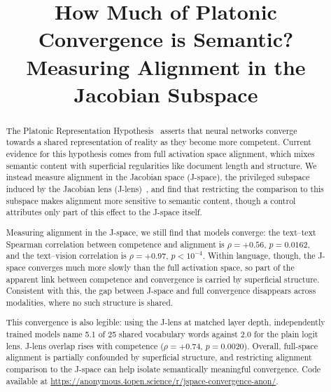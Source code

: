 \documentclass{article}
\title{How Much of Platonic Convergence is Semantic? Measuring Alignment in the Jacobian Subspace}
\author{%
}
\begin{document}
\raggedbottom

\maketitle

\begin{abstract}
  The Platonic Representation Hypothesis~\citep{huh2024platonic} asserts that neural networks converge towards a shared representation of reality as they become more competent. Current evidence for this hypothesis comes from full activation space alignment, which mixes semantic content with superficial regularities like document length and structure. We instead measure alignment in the Jacobian space (J-space), the privileged subspace induced by the Jacobian lens (J-lens)~\citep{gurnee2026verbalizable}, and find that restricting the comparison to this subspace makes alignment more sensitive to semantic content, though a control attributes only part of this effect to the J-space itself.
  
  Measuring alignment in the J-space, we still find that models converge: the text--text Spearman correlation between competence and alignment is $\rho = +0.56$, $p = 0.0162$, and the text--vision correlation is $\rho = +0.97$, $p < 10^{-4}$. Within language, though, the J-space converges much more slowly than the full activation space, so part of the apparent link between competence and convergence is carried by superficial structure. Consistent with this, the gap between J-space and full convergence disappears across modalities, where no such structure is shared.
  
  This convergence is also legible: using the J-lens at matched layer depth, independently trained models name 5.1 of 25 shared vocabulary words against 2.0 for the plain logit lens. J-lens overlap rises with competence ($\rho = +0.74$, $p = 0.0020$). Overall, full-space alignment is partially confounded by superficial structure, and restricting alignment comparison to the J-space can help isolate semantically meaningful convergence. Code available at \url{https://anonymous.4open.science/r/jspace-convergence-anon/}.
\end{abstract}
\end{document}
